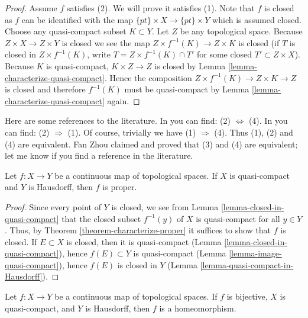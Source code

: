 \begin{proof}
\medskip\noindent
Assume $f$ satisfies (2). We will prove it satisfies (1).
Note that $f$ is closed as $f$ can be identified with the map
$\{pt\} \times X \to \{pt\} \times Y$ which is assumed closed.
Choose any quasi-compact subset $K \subset Y$.
Let $Z$ be any topological space.
Because $Z \times X \to Z \times Y$ is closed
we see the map $Z \times f^{-1}(K) \to Z \times K$
is closed (if $T$ is closed in $Z \times f^{-1}(K)$, write
$T = Z \times f^{-1}(K) \cap T'$ for some closed
$T' \subset Z \times X$). Because $K$ is quasi-compact,
$K \times Z\to Z$ is closed by Lemma \ref{lemma-characterize-quasi-compact}.
Hence the composition $Z \times f^{-1}(K)\to Z \times K \to Z$
is closed and therefore $f^{-1}(K)$ must be quasi-compact
by Lemma \ref{lemma-characterize-quasi-compact} again.
\end{proof}

\begin{remark}
\label{remark-proof-literature}
Here are some references to the literature.
In \cite[I, p. 75, Theorem 1]{Bourbaki} you can find:
(2) $\Leftrightarrow$ (4).
In \cite[I, p. 77, Proposition 6]{Bourbaki} you can find:
(2) $\Rightarrow$ (1).
Of course, trivially we have (1) $\Rightarrow$ (4).
Thus (1), (2) and (4) are equivalent.
Fan Zhou claimed and proved that (3) and (4) are equivalent;
let me know if you find a reference in the literature.
\end{remark}

\begin{lemma}
\label{lemma-closed-map}
Let $f : X \to Y$ be a continuous map of topological spaces.
If $X$ is quasi-compact and $Y$ is Hausdorff, then $f$ is proper.
\end{lemma}

\begin{proof}
Since every point of $Y$ is closed, we see from
Lemma \ref{lemma-closed-in-quasi-compact}
that the closed subset $f^{-1}(y)$ of $X$ is quasi-compact for all $y \in Y$.
Thus, by Theorem \ref{theorem-characterize-proper}
it suffices to show that $f$ is closed.
If $E \subset X$ is closed, then it is quasi-compact
(Lemma \ref{lemma-closed-in-quasi-compact}),
hence $f(E) \subset Y$ is quasi-compact
(Lemma \ref{lemma-image-quasi-compact}),
hence $f(E)$ is closed in $Y$
(Lemma \ref{lemma-quasi-compact-in-Hausdorff}).
\end{proof}

\begin{lemma}
\label{lemma-bijective-map}
Let $f : X \to Y$ be a continuous map of topological spaces.
If $f$ is bijective, $X$ is quasi-compact, and $Y$ is Hausdorff,
then $f$ is a homeomorphism.
\end{lemma}


